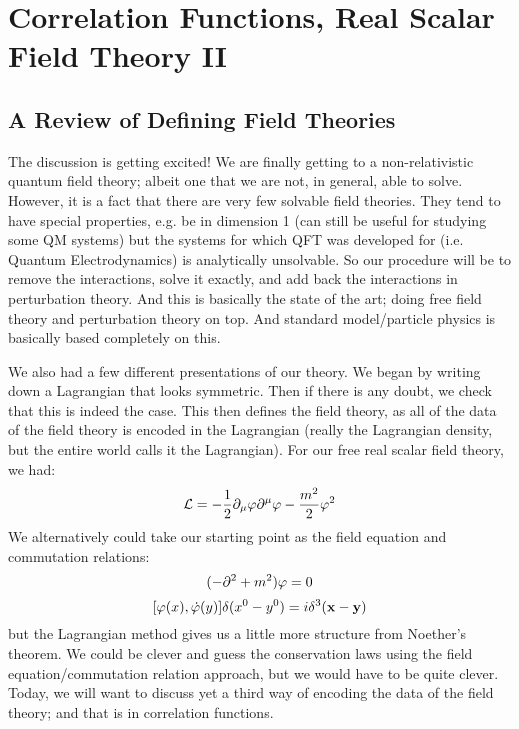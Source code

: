 \section{Correlation Functions, Real Scalar Field Theory II}
\subsection{A Review of Defining Field Theories}
The discussion is getting excited! We are finally getting to a non-relativistic quantum field theory; albeit one that we are not, in general, able to solve. However, it is a fact that there are very few solvable field theories. They tend to have special properties, e.g. be in dimension 1 (can still be useful for studying some QM systems) but the systems for which QFT was developed for (i.e. Quantum Electrodynamics) is analytically unsolvable. So our procedure will be to remove the interactions, solve it exactly, and add back the interactions in perturbation theory. And this is basically the state of the art; doing free field theory and perturbation theory on top. And standard model/particle physics is basically based completely on this.

We also had a few different presentations of our theory. We began by writing down a Lagrangian that looks symmetric. Then if there is any doubt, we check that this is indeed the case. This then defines the field theory, as all of the data of the field theory is encoded in the Lagrangian (really the Lagrangian density, but the entire world calls it the Lagrangian). For our free real scalar field theory, we had:
\begin{equation}\label{eq-freescalarfieldtheorylagrangian}
    \L = -\frac{1}{2}\p_\mu \varphi \p^\mu \varphi - \frac{m^2}{2}\varphi^2
\end{equation}
We alternatively could take our starting point as the field equation and commutation relations:
\begin{equation}\label{eq-kgeqn}
    (-\p^2 + m^2)\varphi = 0
\end{equation}
\begin{equation}\label{eq-freescalarfieldtheorycommutations}
    [\varphi(x), \dot{\varphi}(y)]\delta(x^0 - y^0) = i\delta^3(\v{x} - \v{y})
\end{equation}
but the Lagrangian method gives us a little more structure from Noether's theorem. We could be clever and guess the conservation laws using the field equation/commutation relation approach, but we would have to be quite clever. Today, we will want to discuss yet a third way of encoding the data of the field theory; and that is in correlation functions.

